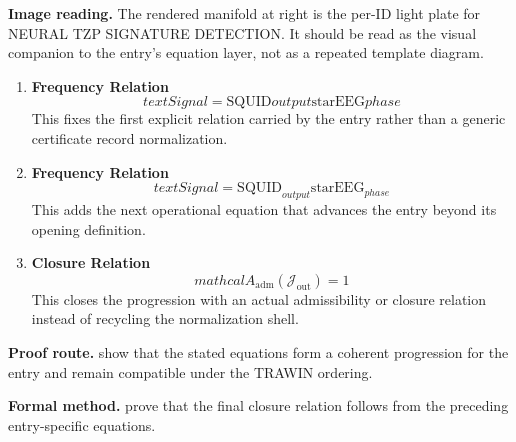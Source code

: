 \begin{samepage}
\noindent\begin{minipage}[t]{0.45\linewidth}
\vspace{0pt}
\raggedright
\scriptsize\textbf{Image reading.} The rendered manifold at right is the per-ID light plate for NEURAL TZP SIGNATURE DETECTION. It should be read as the visual companion to the entry's equation layer, not as a repeated template diagram.\par
\end{minipage}\hfill
\begin{minipage}[t]{0.53\linewidth}
\vspace*{-0.10in}
\raggedright
{}
\end{minipage}
\end{samepage}

\clearpage


\begin{enumerate}[leftmargin=1.6em,itemsep=9pt,topsep=6pt]
\item \textbf{Frequency Relation}
\[
text{Signal} = \text{SQUID} {output} \mathrm{star} \text{EEG} {phase}
\]
This fixes the first explicit relation carried by the entry rather than a generic certificate record normalization.

\item \textbf{Frequency Relation}
\[
text{Signal} = \text{SQUID}_{output} \mathrm{star} \text{EEG}_{phase}
\]
This adds the next operational equation that advances the entry beyond its opening definition.

\item \textbf{Closure Relation}
\[
mathcal{A}_{\mathrm{adm}}\!\left(\mathcal{J}_{\mathrm{out}}\right)=1
\]
This closes the progression with an actual admissibility or closure relation instead of recycling the normalization shell.
\end{enumerate}

\textbf{Proof route.} show that the stated equations form a coherent progression for the entry and remain compatible under the TRAWIN ordering.

\textbf{Formal method.} prove that the final closure relation follows from the preceding entry-specific equations.

\medskip
{}

